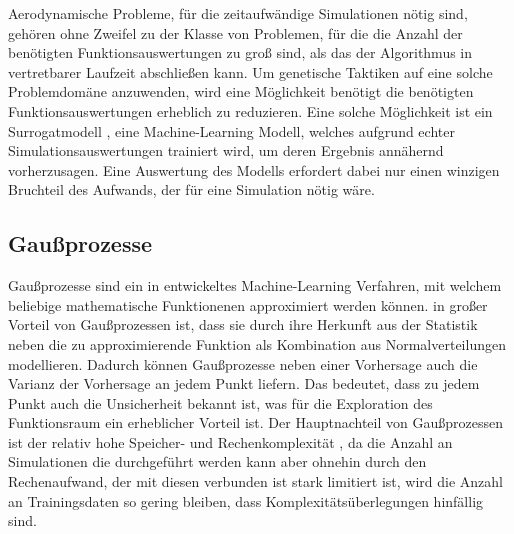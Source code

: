 Aerodynamische Probleme, für die zeitaufwändige Simulationen nötig sind, gehören ohne Zweifel zu der Klasse von Problemen, für die die Anzahl der benötigten Funktionsauswertungen zu groß sind, als das der Algorithmus in vertretbarer Laufzeit abschließen kann.
Um genetische Taktiken auf eine solche Problemdomäne anzuwenden, wird eine Möglichkeit benötigt die benötigten Funktionsauswertungen erheblich zu reduzieren.
Eine solche Möglichkeit ist ein Surrogatmodell \cite{Jin.2011}\cite{Preen.2016}, eine Machine-Learning Modell, welches aufgrund echter Simulationsauswertungen trainiert wird, um deren Ergebnis annähernd vorherzusagen.
Eine Auswertung des Modells erfordert dabei nur einen winzigen Bruchteil des Aufwands, der für eine Simulation nötig wäre.

\subsection{Gaußprozesse}

Gaußprozesse sind ein in \cite{Rasmussen.2008} entwickeltes Machine-Learning Verfahren, mit welchem beliebige mathematische Funktionenen approximiert werden können. in großer Vorteil von Gaußprozessen ist, dass sie durch ihre Herkunft aus der Statistik neben die zu approximierende Funktion als Kombination aus Normalverteilungen modellieren.
Dadurch können Gaußprozesse neben einer Vorhersage auch die Varianz der Vorhersage an jedem Punkt liefern.
Das bedeutet, dass zu jedem Punkt auch die Unsicherheit bekannt ist, was für die Exploration des Funktionsraum
ein erheblicher Vorteil ist.
Der Hauptnachteil von Gaußprozessen ist der relativ hohe Speicher- und Rechenkomplexität , da die Anzahl an Simulationen die durchgeführt werden kann aber ohnehin durch den Rechenaufwand, der mit diesen verbunden ist stark limitiert ist, wird die Anzahl an Trainingsdaten so gering bleiben, dass Komplexitätsüberlegungen hinfällig sind.

